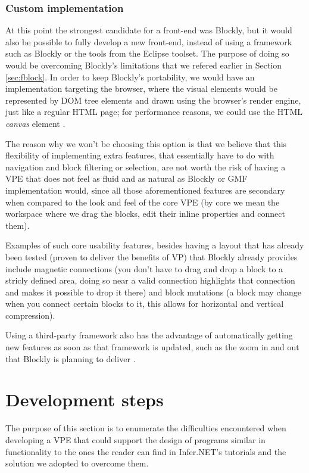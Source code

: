 \subsubsection{Custom implementation}

At this point the strongest candidate for a front-end was Blockly,
but it would also be possible to fully develop a new front-end, instead of using
a framework such as Blockly or the tools from the Eclipse toolset. The purpose of
doing so would be overcoming Blockly's limitations that we refered earlier in
Section \ref{sec:fblock}. In order to keep Blockly's portability, we would have an
implementation targeting the browser, where the visual elements would be
represented by DOM tree elements and drawn using the browser's render engine,
just like a regular HTML page; for performance reasons, we could use the HTML
\textit{canvas} element \cite{w3ccanvas}.

The reason why we won't be choosing this option is that we believe that this
flexibility of implementing extra features, that essentially have to do with
navigation and block filtering or selection, are not worth the risk of having
a VPE that does not feel as fluid and as natural as Blockly or GMF implementation would, since all
those aforementioned features are secondary when compared to the look and feel
of the core VPE (by core we mean the workspace where we drag the blocks, edit
their inline properties and connect them).

Examples of such core usability features, besides having a layout that has already been
tested (proven to deliver the benefits of VP)
that Blockly already provides include magnetic connections
(you don't have to drag and drop a block to a stricly defined area, doing so near
a valid connection highlights that connection and makes it possible to drop it there)
and block mutations (a block may change when you connect certain blocks to it,
this allows for horizontal and vertical compression).

Using a third-party framework also has the advantage of automatically getting new
features as soon as that framework is updated, such as the zoom in and out that
Blockly is planning to deliver \cite{blockly}.

\section{Development steps}

The purpose of this section is to enumerate the difficulties encountered when
developing a VPE that could support the design of programs similar in functionality
to the ones the reader can find in Infer.NET's tutorials \cite{InferNET14t} and
the solution we adopted to overcome them.

